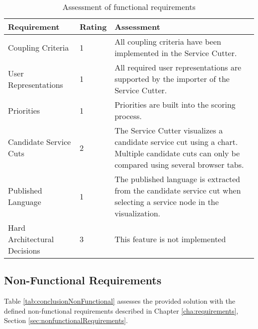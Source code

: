\begin{table}[H]
	\centering
	\caption{Assessment of functional requirements}
	\label{tab:conclusionFunctional}
	\begin{tabular}{|p{100pt}|l|p{250pt}|}
	\hline \textbf{Requirement} & \textbf{Rating} & \textbf{Assessment} \\ 
	\hline Coupling Criteria & 1 & All coupling criteria have been implemented in the Service Cutter.  \\ %
	\hline User Representations & 1 & All required user representations are supported by the importer of the Service Cutter. \\ 
	\hline Priorities & 1 & Priorities are built into the scoring process. \\ 
	\hline Candidate Service Cuts & 2 & The Service Cutter visualizes a candidate service cut using a chart. Multiple candidate cuts can only be compared using several browser tabs. \\ 
	\hline Published Language & 1 & The published language is extracted from the candidate service cut when selecting a service node in the visualization.  \\ 
	\hline Hard Architectural Decisions & 3 & This feature is not implemented \\ %
	\hline 
	\end{tabular} 
\end{table}

\subsection{Non-Functional Requirements}

Table \ref{tab:conclusionNonFunctional} assesses the provided solution with the defined non-functional requirements described in Chapter \ref{cha:requirements}, Section \ref{sec:nonfunctionalRequirements}.

